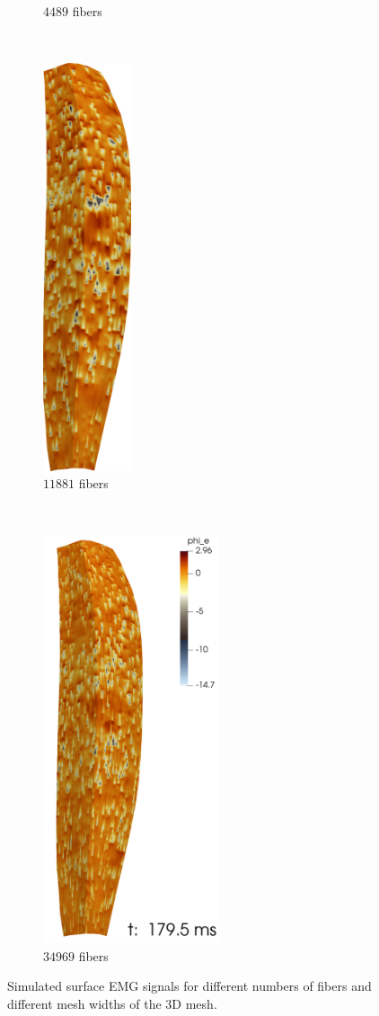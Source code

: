 \begin{figure}
\begin{subfigure}[t]{0.19\textwidth}
    \caption{$4489$ fibers}%
    \label{fig:emg67}%
  \end{subfigure}  \,
  \begin{subfigure}[t]{0.19\textwidth}%
    \centering%
    \includegraphics[height=12cm]{images/results/application/emg109.png}%
    \caption{$\num{11881}$ fibers}%
    \label{fig:emg109}%
  \end{subfigure}    \,
  \begin{subfigure}[t]{0.35\textwidth}%
    \centering%
    \includegraphics[height=12cm]{images/results/application/emg187.png}%
    \caption{$\num{34969}$ fibers}%
    \label{fig:emg187}%
  \end{subfigure}   
  \caption{Simulated surface EMG signals for different numbers of fibers and different mesh widths of the 3D mesh.}%
  \label{fig:emg_hpc}%
\end{figure}%

